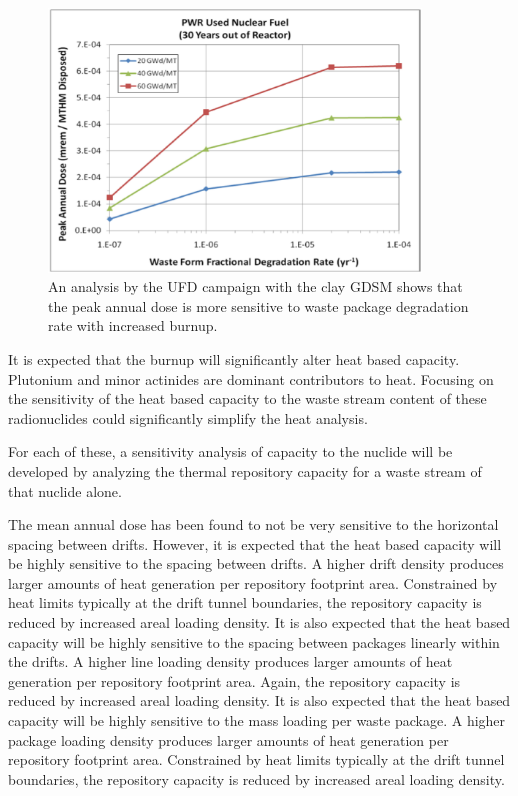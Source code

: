 \begin{figure}[h!]
  \begin{center}
    \includegraphics[height=7cm]{./chapters/future/BUandWPdeg.eps}
  \end{center}
  \caption[Burnup and WP Degradation Rate Peak Dose Sensitivity]{An analysis by the UFD campaign with the clay GDSM shows that
  the peak annual dose is more sensitive to waste package degradation rate with 
  increased burnup\cite{clayton_generic_2011}.}
  \label{fig:BUandWPdeg}
\end{figure}
\clearpage

It is expected that the burnup will significantly alter heat based capacity. 
Plutonium and minor actinides are dominant contributors to heat. Focusing on
the sensitivity of the heat based capacity to the waste stream content of 
these radionuclides could significantly simplify the heat analysis. 
 
For each of these, a sensitivity analysis of capacity to the nuclide will be 
developed by analyzing the thermal repository capacity for a waste stream of 
that nuclide alone.  


The mean annual dose has been found to not be very sensitive to the horizontal 
spacing between drifts. However, it is expected that the heat based capacity 
will be highly sensitive to the 
spacing between drifts. A higher drift density produces larger amounts of heat 
generation per repository footprint area. Constrained by heat limits typically 
at the drift tunnel boundaries, the repository capacity is reduced by increased 
areal loading density. 
It is also expected that the heat based capacity will be highly sensitive to the 
spacing between packages linearly within the drifts. A higher line loading 
density produces larger amounts of heat generation per repository footprint 
area.  Again, the repository capacity is reduced by increased areal loading 
density.  It is also expected that the heat based capacity will be highly 
sensitive to the mass loading per waste package. A higher package loading density 
produces larger amounts of heat 
generation per repository footprint area. Constrained by heat limits typically 
at the drift tunnel boundaries, the repository capacity is reduced by increased 
areal loading density. 

